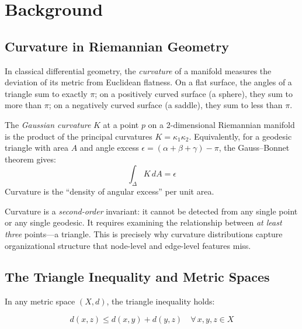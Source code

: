 \documentclass{../yalumba}
\begin{document}
\section{Background}
\label{sec:background}

\subsection{Curvature in Riemannian Geometry}

In classical differential geometry, the \emph{curvature} of a manifold
measures the deviation of its metric from Euclidean flatness.  On a flat
surface, the angles of a triangle sum to exactly $\pi$; on a positively
curved surface (a sphere), they sum to more than $\pi$; on a negatively
curved surface (a saddle), they sum to less than $\pi$.

\begin{definition}
The \emph{Gaussian curvature} $K$ at a point $p$ on a 2-dimensional
Riemannian manifold is the product of the principal curvatures $K = \kappa_1
\kappa_2$.  Equivalently, for a geodesic triangle with area $A$ and angle
excess $\epsilon = (\alpha + \beta + \gamma) - \pi$, the Gauss--Bonnet
theorem gives:
\begin{equation}
  \int_{\Delta} K\, dA = \epsilon
  \label{eq:gauss-bonnet}
\end{equation}
Curvature is the ``density of angular excess'' per unit area.
\end{definition}

Curvature is a \emph{second-order} invariant: it cannot be detected from
any single point or any single geodesic.  It requires examining the
relationship between \emph{at least three} points---a triangle.  This is
precisely why curvature distributions capture organizational structure that
node-level and edge-level features miss.


\subsection{The Triangle Inequality and Metric Spaces}

In any metric space $(X, d)$, the triangle inequality holds:

\begin{equation}
  d(x, z) \leq d(x, y) + d(y, z) \quad \forall\, x, y, z \in X
  \label{eq:triangle-inequality}
\end{equation}
\end{document}
